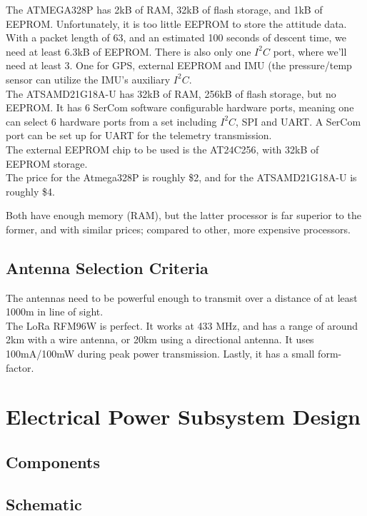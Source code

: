 \documentclass[10pt, a4paper]{article}
\begin{document}
The ATMEGA328P\cite{uno} has 2kB of RAM, 32kB of flash storage, and 1kB of EEPROM. Unfortunately, it is too little EEPROM to store the attitude data. With a packet length of 63, and an estimated 100 seconds of descent time, we need at least 6.3kB of EEPROM. There is also only one $I^2C$ port, where we'll need at least 3. One for GPS, external EEPROM and IMU (the pressure/temp sensor can utilize the IMU's auxiliary $I^2C$.\\

The ATSAMD21G18A-U\cite{cpu} has 32kB of RAM, 256kB of flash storage, but no EEPROM. It has 6 SerCom software configurable hardware ports, meaning one can select 6 hardware ports from a set including $I^2C$, SPI and UART. A SerCom port can be set up for UART for the telemetry transmission. \\

The external EEPROM chip to be used is the AT24C256\cite{eeprom}, with 32kB of EEPROM storage.\\

The price\cite{findchips} for the Atmega328P is roughly \$2, and for the ATSAMD21G18A-U is roughly \$4.

Both have enough memory (RAM), but the latter processor is far superior to the former, and with similar prices; compared to other, more expensive processors.

\subsection{Antenna Selection Criteria}

The antennas need to be powerful enough to transmit over a distance of at least 1000m in line of sight.\\

The LoRa RFM96W\cite{lora} is perfect. It works at 433 MHz, and has a range of around 2km with a wire antenna, or 20km using a directional antenna. It uses 100mA/100mW during peak power transmission. Lastly, it has a small form-factor.

\newpage

\section{Electrical Power Subsystem Design}
\subsection{Components}
\subsection{Schematic}
\end{document}
